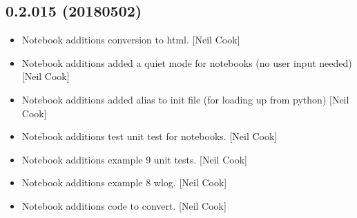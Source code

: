 \documentclass[a4paper,10pt,english]{report}
\begin{document}
\subsection{0.2.015 (2018\sphinxhyphen{}05\sphinxhyphen{}02)}
\label{\detokenize{misc/changelog:id464}}\begin{itemize}
\item {} 
Notebook additions \sphinxhyphen{} conversion to html. {[}Neil Cook{]}

\item {} 
Notebook additions \sphinxhyphen{} added a quiet mode for notebooks (no user input
needed) {[}Neil Cook{]}

\item {} 
Notebook additions \sphinxhyphen{} added  alias to init file (for loading
up from python) {[}Neil Cook{]}

\item {} 
Notebook additions \sphinxhyphen{} test unit test for notebooks. {[}Neil Cook{]}

\item {} 
Notebook additions \sphinxhyphen{} example 9 \sphinxhyphen{} unit tests. {[}Neil Cook{]}

\item {} 
Notebook additions \sphinxhyphen{} example 8 \sphinxhyphen{} wlog. {[}Neil Cook{]}

\item {} 
Notebook additions \sphinxhyphen{} code to convert. {[}Neil Cook{]}

\end{itemize}
\end{document}
